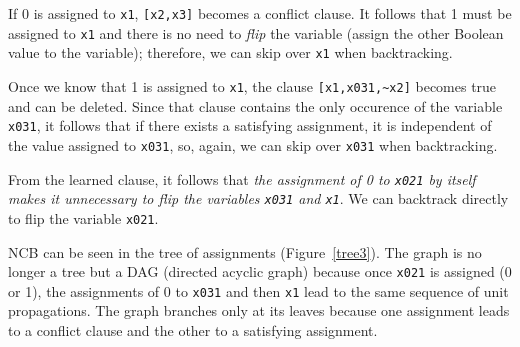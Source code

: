 \documentclass[11pt]{report}
\newcommand*{\p}[1]{\textup{\texttt{#1}}}
\begin{document}
If 0 is assigned to \p{x1}, \p{[x2,x3]} becomes a conflict clause. It
follows that 1 must be assigned to \p{x1} and there is no need to
\emph{flip} the variable (assign the other Boolean value to the
variable); therefore, we can skip over \p{x1} when backtracking.

Once we know that 1 is assigned to \p{x1}, the clause
\verb+[x1,x031,~x2]+ becomes true and can be deleted. Since that clause
contains the only occurence of the variable \p{x031}, it follows that if
there exists a satisfying assignment, it is independent of the value
assigned to \p{x031}, so, again, we can skip over \p{x031} when
backtracking.

From the learned clause, it follows that \emph{the assignment of 0
to \p{x021} by itself makes it unnecessary to flip the variables
\p{x031} and \p{x1}}. We can backtrack directly to flip the variable
\p{x021}.

NCB can be seen in the tree of assignments (Figure~\ref{tree3}). The
graph is no longer a tree but a DAG (directed acyclic graph) because
once \p{x021} is assigned (0 or 1), the assignments of 0 to \p{x031} and
then \p{x1} lead to the same sequence of unit propagations. The graph
branches only at its leaves because one assignment leads to a conflict
clause and the other to a satisfying assignment.
\end{document}
